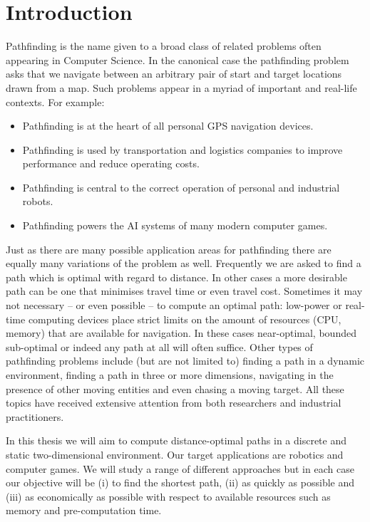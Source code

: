 \chapter{Introduction}
\label{cha::intro}

Pathfinding is the name given to a broad class of related problems
often appearing in Computer Science. In the canonical case the
pathfinding problem asks that we navigate between an arbitrary pair of 
start and target locations drawn from a map. Such problems
appear in a myriad of important and real-life contexts. For example:
\begin{itemize}
\item Pathfinding is at the heart of all personal GPS navigation devices.
\item Pathfinding is used by transportation and logistics companies to 
improve performance and reduce operating costs.
\item Pathfinding is central to the correct operation of personal and industrial robots.
\item Pathfinding powers the AI systems of many modern computer games.
\end{itemize}

\noindent Just as there are many possible application areas for pathfinding there are
equally many variations of the problem as well. Frequently we are
asked to find a path which is optimal with regard to distance. In other cases
a more desirable path can be one that minimises travel time or even travel
cost.  Sometimes it may not necessary -- or even possible -- to compute an
optimal path: low-power or real-time computing devices place
strict limits on the amount of resources (CPU, memory) that are available for
navigation.  In these cases near-optimal, bounded sub-optimal or indeed any
path at all will often suffice. Other types of pathfinding problems include
(but are not limited to) finding a path in a dynamic environment, finding a path 
in three or more dimensions, navigating in the presence of other moving entities and
even chasing a moving target. All these topics have received 
extensive attention from both researchers and industrial practitioners.

In this thesis we will aim to compute distance-optimal paths in a discrete
and static two-dimensional environment. Our target applications are robotics and computer games.
We will study a range of different approaches but in each case our objective will
be (i) to find the shortest path, (ii) as quickly as possible and (iii) as economically
as possible with respect to available resources such as memory and pre-computation time. 

